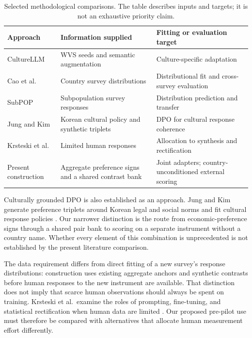 \begin{table}[htbp]\centering\small
\caption{Selected methodological comparisons. The table describes inputs and targets; it is not an exhaustive priority claim.}\label{tab:positioning}
\begin{tabularx}{\linewidth}{@{}>{\raggedright\arraybackslash}p{29mm}>{\raggedright\arraybackslash}X>{\raggedright\arraybackslash}X@{}}\toprule
Approach & Information supplied & Fitting or evaluation target\\\midrule
CultureLLM \cite{li2024culture} & WVS seeds and semantic augmentation & Culture-specific adaptation\\
Cao et al.\ \cite{cao2025} & Country survey distributions & Distributional fit and cross-survey evaluation\\
SubPOP \cite{suh2025} & Subpopulation survey responses & Distribution prediction and transfer\\
Jung and Kim \cite{jung2026} & Korean cultural policy and synthetic triplets & DPO for cultural response coherence\\
Krsteski et al.\ \cite{krsteski2026} & Limited human responses & Allocation to synthesis and rectification\\
Present construction & Aggregate preference signs and a shared contrast bank & Joint adapters; country-unconditioned external scoring\\\bottomrule
\end{tabularx}\end{table}

Culturally grounded DPO is also established as an approach. Jung and Kim generate preference triplets around Korean legal and social norms and fit cultural response policies \cite{jung2026}. Our narrower distinction is the route from economic-preference signs through a shared pair bank to scoring on a separate instrument without a country name. Whether every element of this combination is unprecedented is not established by the present literature comparison.

The data requirement differs from direct fitting of a new survey's response distributions: construction uses existing aggregate anchors and synthetic contrasts before human responses to the new instrument are available. That distinction does not imply that scarce human observations should always be spent on training. Krsteski et al.\ examine the roles of prompting, fine-tuning, and statistical rectification when human data are limited \cite{krsteski2026}. Our proposed pre-pilot use must therefore be compared with alternatives that allocate human measurement effort differently.

